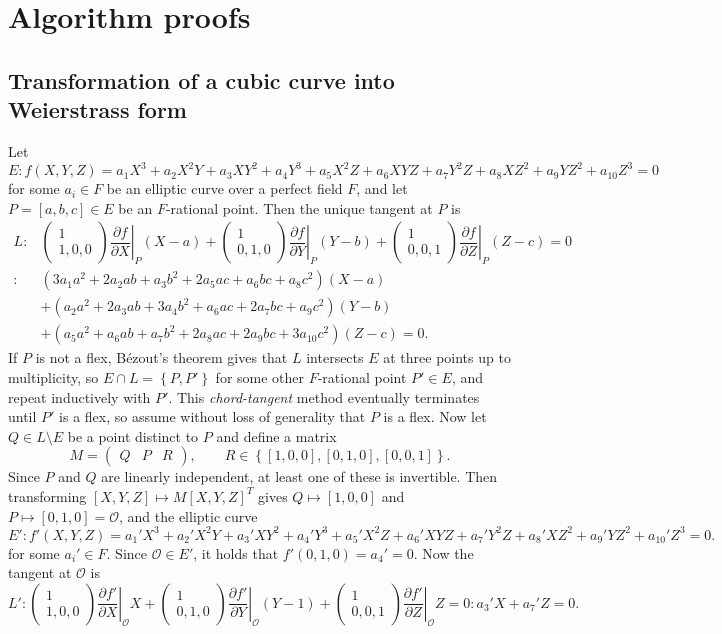 \documentclass{article}
\newcommand{\val}[1]{\left. #1 \right\rvert}
\newcommand{\rb}[1]{\left( #1 \right)}
\renewcommand{\sb}[1]{\left[ #1 \right]}
\newcommand{\cb}[1]{\left\{ #1 \right\}}
\newcommand{\two}[2]{\begin{pmatrix} #1 \\ #2 \end{pmatrix}}
\newcommand{\three}[3]{\begin{pmatrix} #1 & #2 & #3 \end{pmatrix}}
\theoremstyle{definition}\newtheorem*{definition}{Definition}
\theoremstyle{definition}\newtheorem*{example}{Example}
\theoremstyle{definition}\newtheorem*{remark}{Remark}
\begin{document}
\pagebreak

\section{Algorithm proofs}

\subsection{Transformation of a cubic curve into Weierstrass form}

Let
$$ E : f\rb{X, Y, Z} = a_1X^3 + a_2X^2Y + a_3XY^2 + a_4Y^3 + a_5X^2Z + a_6XYZ + a_7Y^2Z + a_8XZ^2 + a_9YZ^2 + a_{10}Z^3 = 0 $$
for some $ a_i \in F $ be an elliptic curve over a perfect field $ F $, and let $ P = \sb{a, b, c} \in E $ be an $ F $-rational point. Then the unique tangent at $ P $ is
\begin{align*}
L
: & \two{1}{1, 0, 0}\val{\dfrac{\partial f}{\partial X}}_P\rb{X - a} + \two{1}{0, 1, 0}\val{\dfrac{\partial f}{\partial Y}}_P\rb{Y - b} + \two{1}{0, 0, 1}\val{\dfrac{\partial f}{\partial Z}}_P\rb{Z - c} = 0 \\
: & \rb{3a_1a^2 + 2a_2ab + a_3b^2 + 2a_5ac + a_6bc + a_8c^2}\rb{X - a} \\
& + \rb{a_2a^2 + 2a_3ab + 3a_4b^2 + a_6ac + 2a_7bc + a_9c^2}\rb{Y - b} \\
& + \rb{a_5a^2 + a_6ab + a_7b^2 + 2a_8ac + 2a_9bc + 3a_{10}c^2}\rb{Z - c} = 0.
\end{align*}
If $ P $ is not a flex, Bézout's theorem gives that $ L $ intersects $ E $ at three points up to multiplicity, so $ E \cap L = \cb{P, P'} $ for some other $ F $-rational point $ P' \in E $, and repeat inductively with $ P' $. This \emph{chord-tangent} method eventually terminates until $ P' $ is a flex, so assume without loss of generality that $ P $ is a flex. Now let $ Q \in L \setminus E $ be a point distinct to $ P $ and define a matrix
$$ M = \three{Q}{P}{R}, \qquad R \in \cb{\sb{1, 0, 0}, \sb{0, 1, 0}, \sb{0, 0, 1}}. $$
Since $ P $ and $ Q $ are linearly independent, at least one of these is invertible. Then transforming $ \sb{X, Y, Z} \mapsto M\sb{X, Y, Z}^T $ gives $ Q \mapsto \sb{1, 0, 0} $ and $ P \mapsto \sb{0, 1, 0} = \mathcal{O} $, and the elliptic curve
$$ E' : f'\rb{X, Y, Z} = a_1'X^3 + a_2'X^2Y + a_3'XY^2 + a_4'Y^3 + a_5'X^2Z + a_6'XYZ + a_7'Y^2Z + a_8'XZ^2 + a_9'YZ^2 + a_{10}'Z^3 = 0. $$
for some $ a_i' \in F $. Since $ \mathcal{O} \in E' $, it holds that $ f'\rb{0, 1, 0} = a_4' = 0 $. Now the tangent at $ \mathcal{O} $ is
$$ L' : \two{1}{1, 0, 0}\val{\dfrac{\partial f'}{\partial X}}_\mathcal{O}X + \two{1}{0, 1, 0}\val{\dfrac{\partial f'}{\partial Y}}_\mathcal{O}\rb{Y - 1} + \two{1}{0, 0, 1}\val{\dfrac{\partial f'}{\partial Z}}_\mathcal{O}Z = 0 : a_3'X + a_7'Z = 0. $$
\end{document}
